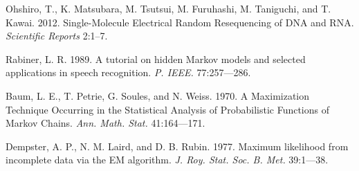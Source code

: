 \documentclass{biophys_letter}
\begin{document}
\begin{thebibliography}{99}
  Ohshiro, T., K. Matsubara, M. Tsutsui, M. Furuhashi, M. Taniguchi, and T. Kawai. 
  2012.
  Single-Molecule Electrical Random Resequencing of DNA and RNA.
  {\it Scientific Reports} 
  2:1--7.

  Rabiner, L. R.
  1989.
  A tutorial on hidden Markov models and selected applications in speech recognition.
  {\it P. IEEE.}
  77:257---286.

  Baum, L. E., T. Petrie, G. Soules, and N. Weiss. 
  1970.
  A Maximization Technique Occurring in the Statistical Analysis of Probabilistic Functions of Markov Chains.
  {\it Ann. Math. Stat.}
  41:164---171.

  Dempster, A. P., N. M. Laird, and D. B. Rubin.
  1977.
  Maximum likelihood from incomplete data via the EM algorithm.
  {\it J. Roy. Stat. Soc. B. Met.}
  39:1---38.

\end{thebibliography}

\end{document}
